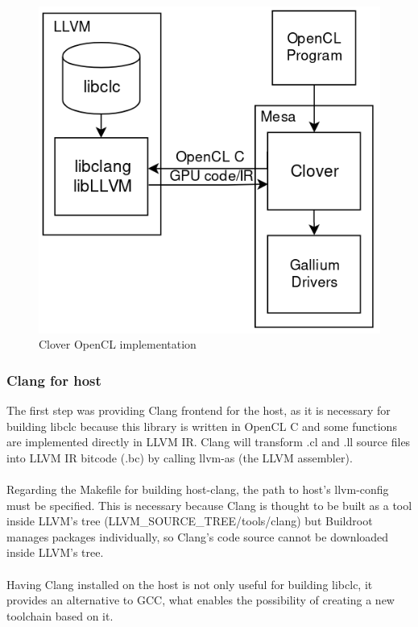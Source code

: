 \documentclass[12pt,a4paper,oneside]{article}
\begin{document}
\begin{figure}[H]
\centering
  \includegraphics[scale=0.65]{img/clover.png}
  \caption{Clover OpenCL implementation}
  \label{fig:clover}
\end{figure}

\subsubsection*{Clang for host}
The first step was providing Clang frontend for the host, as it is necessary for
building libclc because this library is written in OpenCL C and some functions
are implemented directly in LLVM IR. Clang will transform .cl and .ll source
files into LLVM IR bitcode (.bc) by calling llvm-as (the LLVM assembler).\\\\
Regarding the Makefile for building host-clang, the path to host's llvm-config
must be specified. This is necessary because Clang is thought to be built as a
tool inside LLVM's tree (LLVM\_SOURCE\_TREE/tools/clang) but Buildroot manages
packages individually, so Clang's code source cannot be downloaded inside LLVM's
tree.\\\\
Having Clang installed on the host is not only useful for building libclc, it
provides an alternative to GCC, what enables the possibility of creating a new
toolchain based on it.
\end{document}
